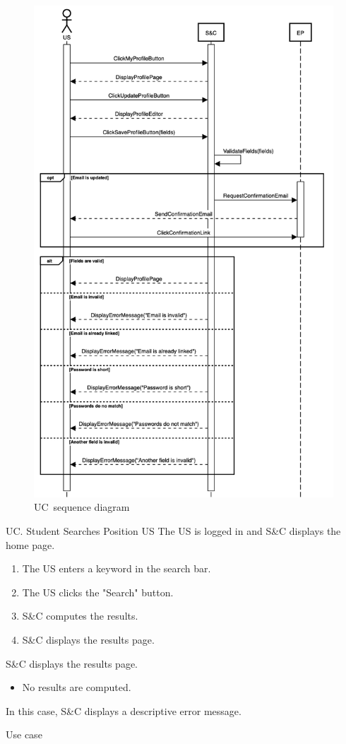 \begin{figure}
    \centering
    \includegraphics[width=13cm]{images/sequence-diagrams/student-updates-profile.png}
    \caption{UC\theuc\ sequence diagram}
\end{figure}


\clearpage
\begin{usecase}
    {UC\theuc. Student Searches Position}
    {US}
    {The US is logged in and S\&C displays the home page.}
    {\begin{enumerate}[leftmargin=*]
        \item The US enters a keyword in the search bar.
        \item The US clicks the "Search" button.
        \item S\&C computes the results.
        \item S\&C displays the results page.
    \end{enumerate}}
    {S\&C displays the results page.}
    {\begin{itemize}[leftmargin=*, label=\tiny\textbullet]
        \item No results are computed.
    \end{itemize}
    In this case, S\&C displays a descriptive error message.}
    {Use case \theuc}
\end{usecase}

